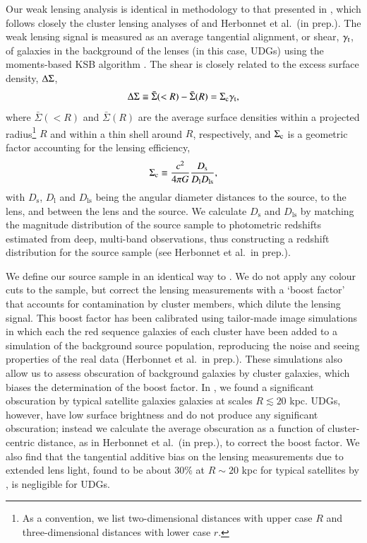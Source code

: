 \documentclass[usenatbib,fleqn]{mnras}
\begin{document}
Our weak lensing analysis is identical in methodology to that presented in \cite{sifon17}, which follows closely the cluster lensing analyses of \cite{hoekstra15} and Herbonnet et al.\ (in prep.). The weak lensing signal is measured as an average tangential alignment, or shear, $\gamma_\mathrm{t}$, of galaxies in the background of the lenses (in this case, UDGs) using the moments-based KSB algorithm \citep{kaiser95,luppino97,hoekstra98}. The shear is closely related to the excess surface density, $\Delta\Sigma$, 
\begin{equation}
 \Delta\Sigma \equiv \bar\Sigma(<R) - \bar\Sigma(R) = \Sigma_\mathrm{c}\gamma_\mathrm{t},
\end{equation}
where $\bar\Sigma(<R)$ and $\bar\Sigma(R)$ are the average surface densities within a projected radius\footnote{As a convention, we list two-dimensional distances with upper case $R$ and three-dimensional distances with lower case $r$.} $R$ and within a thin shell around $R$, respectively, and $\Sigma_\mathrm{c}$ is a geometric factor accounting for the lensing efficiency,
\begin{equation}
 \Sigma_\mathrm{c} \equiv \frac{c^2}{4\pi G} \frac{D_\mathrm{s}}{D_\mathrm{l}D_\mathrm{ls}},
\end{equation}
with $D_\mathrm{s}$, $D_\mathrm{l}$ and $D_\mathrm{ls}$ being the angular diameter distances to the source, to the lens, and between the lens and the source. We calculate $D_\mathrm{s}$ and $D_\mathrm{ls}$ by matching the magnitude distribution of the source sample to photometric redshifts estimated from deep, multi-band observations, thus constructing a redshift distribution for the source sample (see Herbonnet et al.\ in prep.).

We define our source sample in an identical way to \cite{sifon17}. We do not apply any colour cuts to the sample, but correct the lensing measurements with a `boost factor' that accounts for contamination by cluster members, which dilute the lensing signal. This boost factor has been calibrated using tailor-made image simulations in which each the red sequence galaxies of each cluster have been added to a simulation of the background source population, reproducing the noise and seeing properties of the real data (Herbonnet et al.\ in prep.). These simulations also allow us to assess obscuration of background galaxies by cluster galaxies, which biases the determination of the boost factor. In \cite{sifon17}, we found a significant obscuration by typical satellite galaxies galaxies at scales $R\lesssim20$ kpc. UDGs, however, have low surface brightness and do not produce any significant obscuration; instead we calculate the average obscuration as a function of cluster-centric distance, as in Herbonnet et al.\ (in prep.), to correct the boost factor. We also find that the tangential additive bias on the lensing measurements due to extended lens light, found to be about 30\% at $R\sim20$ kpc for typical satellites by \citep{sifon17}, is negligible for UDGs.
\end{document}
